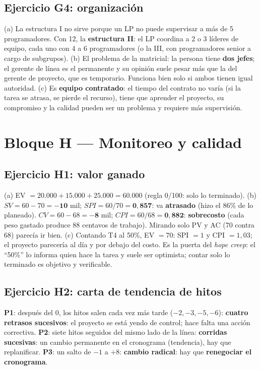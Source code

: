 \documentclass[11pt,a4paper]{article}
\begin{document}
\subsection*{Ejercicio G4: organización}
(a) La estructura I no sirve porque un LP no puede supervisar a más de 5 programadores. Con 12, la
\textbf{estructura II}: el LP coordina a 2 o 3 líderes de equipo, cada uno con 4 a 6 programadores (o la III, con
programadores senior a cargo de subgrupos). (b) El problema de la matricial: la persona tiene \textbf{dos jefes};
el gerente de línea es el permanente y su opinión suele pesar más que la del gerente de proyecto, que es temporario.
Funciona bien solo si ambos tienen igual autoridad. (c) Es \textbf{equipo contratado}: el tiempo del contrato no
varía (si la tarea se atrasa, se pierde el recurso), tiene que aprender el proyecto, su compromiso y la calidad
pueden ser un problema y requiere más supervisión.

\section{Bloque H --- Monitoreo y calidad}
\subsection*{Ejercicio H1: valor ganado}
(a) EV $= 20.000 + 15.000 + 25.000 = \mathbf{60.000}$ (regla 0/100: solo lo terminado).
(b) $SV = 60 - 70 = \mathbf{-10}$ mil; $SPI = 60/70 = \mathbf{0{,}857}$: va \textbf{atrasado} (hizo el 86\% de lo
planeado). $CV = 60 - 68 = \mathbf{-8}$ mil; $CPI = 60/68 = \mathbf{0{,}882}$: \textbf{sobrecosto} (cada peso
gastado produce 88 centavos de trabajo). Mirando solo PV y AC (70 contra 68) parecía ir bien.
(c) Contando T4 al 50\%, EV $= 70$: SPI $= 1$ y CPI $= 1{,}03$; el proyecto parecería al día y por debajo del costo.
Es la puerta del \emph{hope creep}: el ``50\%'' lo informa quien hace la tarea y suele ser optimista; contar solo
lo terminado es objetivo y verificable.

\subsection*{Ejercicio H2: carta de tendencia de hitos}
\textbf{P1}: después del 0, los hitos salen cada vez más tarde ($-2, -3, -5, -6$): \textbf{cuatro retrasos
sucesivos}: el proyecto se está yendo de control; hace falta una acción correctiva. \textbf{P2}: siete hitos
seguidos del mismo lado de la línea: \textbf{corridas sucesivas}: un cambio permanente en el cronograma
(tendencia), hay que replanificar. \textbf{P3}: un salto de $-1$ a $+8$: \textbf{cambio radical}: hay que
\textbf{renegociar el cronograma}.
\end{document}
